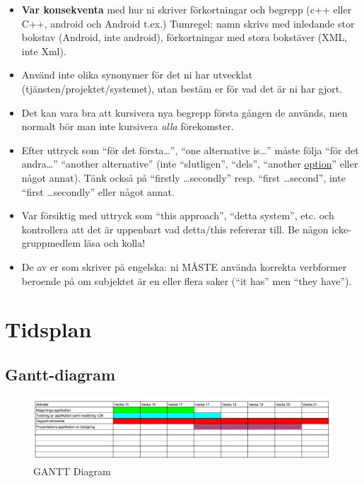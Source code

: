 \documentclass[a4paper,12pt]{article}
\begin{document}
\begin{itemize}
\item    \textbf{Var konsekventa} med hur ni skriver förkortningar och begrepp (c++ eller C++, android och Android t.ex.) Tumregel: namn skrivs med inledande stor bokstav (Android, inte android), förkortningar med stora bokstäver (XML, inte Xml).
\item    Använd inte olika synonymer för det ni har utvecklat (tjänsten/projektet/systemet), utan bestäm er för vad det är ni har gjort.

\item    Det kan vara bra att kursivera nya begrepp första gången de används, men normalt bör man inte kursivera \emph{alla} förekomster.

\item    Efter uttryck som ``för det första\ldots'', ``one alternative is\ldots'' måste följa ``för det andra\ldots'' ``another alternative'' (inte ``slutligen'', ``dels'', ``another \underline{option}'' eller något annat).  Tänk också på ``firstly \ldots secondly'' resp. ``first \ldots second'', inte ``first \ldots secondly'' eller något annat.

\item    Var försiktig med uttryck som ``this approach'', ``detta system'', etc. och kontrollera att det är uppenbart vad detta/this refererar till. Be någon icke-gruppmedlem läsa och kolla!

\item    De av er som skriver på engelska: ni MÅSTE använda korrekta verbformer beroende på om subjektet är en eller flera saker (``it has'' men ``they have'').
\end{itemize}

\section{Tidsplan}
\subsection{Gantt-diagram}
\begin{figure}[h]
	\includegraphics[width=15cm]{media/GANTT.png}
	\caption{GANTT Diagram}
	\label{}
\end{figure}
\end{document}
